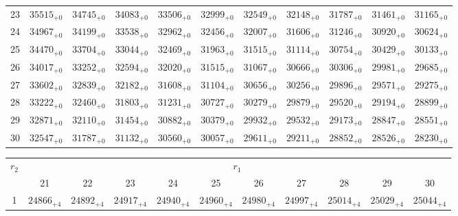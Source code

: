 \documentclass[10pt, a4paper]{article}
\begin{document}
\begin{center}
\begin{tabular}{c || c c c c c | c c c c c}
        23 & \({35515}_{+0}\) & \({34745}_{+0}\) & \({34083}_{+0}\) & \({33506}_{+0}\) & \({32999}_{+0}\) & \({32549}_{+0}\) & \({32148}_{+0}\) & \({31787}_{+0}\) & \({31461}_{+0}\) & \({31165}_{+0}\)\\
        24 & \({34967}_{+0}\) & \({34199}_{+0}\) & \({33538}_{+0}\) & \({32962}_{+0}\) & \({32456}_{+0}\) & \({32007}_{+0}\) & \({31606}_{+0}\) & \({31246}_{+0}\) & \({30920}_{+0}\) & \({30624}_{+0}\)\\
        25 & \({34470}_{+0}\) & \({33704}_{+0}\) & \({33044}_{+0}\) & \({32469}_{+0}\) & \({31963}_{+0}\) & \({31515}_{+0}\) & \({31114}_{+0}\) & \({30754}_{+0}\) & \({30429}_{+0}\) & \({30133}_{+0}\)\\
        \hline
        26 & \({34017}_{+0}\) & \({33252}_{+0}\) & \({32594}_{+0}\) & \({32020}_{+0}\) & \({31515}_{+0}\) & \({31067}_{+0}\) & \({30666}_{+0}\) & \({30306}_{+0}\) & \({29981}_{+0}\) & \({29685}_{+0}\)\\
        27 & \({33602}_{+0}\) & \({32839}_{+0}\) & \({32182}_{+0}\) & \({31608}_{+0}\) & \({31104}_{+0}\) & \({30656}_{+0}\) & \({30256}_{+0}\) & \({29896}_{+0}\) & \({29571}_{+0}\) & \({29275}_{+0}\)\\
        28 & \({33222}_{+0}\) & \({32460}_{+0}\) & \({31803}_{+0}\) & \({31231}_{+0}\) & \({30727}_{+0}\) & \({30279}_{+0}\) & \({29879}_{+0}\) & \({29520}_{+0}\) & \({29194}_{+0}\) & \({28899}_{+0}\)\\
        29 & \({32871}_{+0}\) & \({32110}_{+0}\) & \({31454}_{+0}\) & \({30882}_{+0}\) & \({30379}_{+0}\) & \({29932}_{+0}\) & \({29532}_{+0}\) & \({29173}_{+0}\) & \({28847}_{+0}\) & \({28551}_{+0}\)\\
        30 & \({32547}_{+0}\) & \({31787}_{+0}\) & \({31132}_{+0}\) & \({30560}_{+0}\) & \({30057}_{+0}\) & \({29611}_{+0}\) & \({29211}_{+0}\) & \({28852}_{+0}\) & \({28526}_{+0}\) & \({28230}_{+0}\)\\
        \hline
    \end{tabular}
    \pagebreak
    \begin{tabular}{c || c c c c c | c c c c c}
        \multirow{2}{*}{\(r_2\)} & \multicolumn{10}{c}{\(r_1\)} \\
        & 21 & 22 & 23 & 24 & 25 & 26 & 27 & 28 & 29 & 30\\
        \hline\hline
        1 & \({24866}_{+4}\) & \({24892}_{+4}\) & \({24917}_{+4}\) & \({24940}_{+4}\) & \({24960}_{+4}\) & \({24980}_{+4}\) & \({24997}_{+4}\) & \({25014}_{+4}\) & \({25029}_{+4}\) & \({25044}_{+4}\)\\

\end{tabular}
\end{center}
\end{document}

